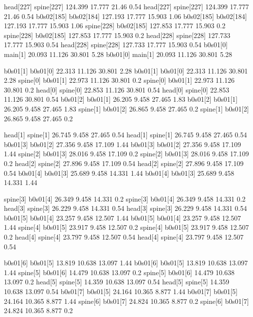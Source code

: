 head[227]    spine[227]    124.399    17.777    21.46    0.54
head[227]    spine[227]    124.399    17.777    21.46    0.54
b0s02[185]    b0s02[184]    127.193    17.777    15.903    1.06
b0s02[185]    b0s02[184]    127.193    17.777    15.903    1.06
spine[228]    b0s02[185]    127.853    17.777    15.903    0.2
spine[228]    b0s02[185]    127.853    17.777    15.903    0.2
head[228]    spine[228]    127.733    17.777    15.903    0.54
head[228]    spine[228]    127.733    17.777    15.903    0.54
b0s01[0]    main[1]    20.093    11.126    30.801    5.28
b0s01[0]    main[1]    20.093    11.126    30.801    5.28


b0s01[1]    b0s01[0]    22.313    11.126    30.801    2.28
b0s01[1]    b0s01[0]    22.313    11.126    30.801    2.28
spine[0]    b0s01[1]    22.973    11.126    30.801    0.2
spine[0]    b0s01[1]    22.973    11.126    30.801    0.2
head[0]    spine[0]    22.853    11.126    30.801    0.54
head[0]    spine[0]    22.853    11.126    30.801    0.54
b0s01[2]    b0s01[1]    26.205    9.458    27.465    1.83
b0s01[2]    b0s01[1]    26.205    9.458    27.465    1.83
spine[1]    b0s01[2]    26.865    9.458    27.465    0.2
spine[1]    b0s01[2]    26.865    9.458    27.465    0.2


head[1]    spine[1]    26.745    9.458    27.465    0.54
head[1]    spine[1]    26.745    9.458    27.465    0.54
b0s01[3]    b0s01[2]    27.356    9.458    17.109    1.44
b0s01[3]    b0s01[2]    27.356    9.458    17.109    1.44
spine[2]    b0s01[3]    28.016    9.458    17.109    0.2
spine[2]    b0s01[3]    28.016    9.458    17.109    0.2
head[2]    spine[2]    27.896    9.458    17.109    0.54
head[2]    spine[2]    27.896    9.458    17.109    0.54
b0s01[4]    b0s01[3]    25.689    9.458    14.331    1.44
b0s01[4]    b0s01[3]    25.689    9.458    14.331    1.44


spine[3]    b0s01[4]    26.349    9.458    14.331    0.2
spine[3]    b0s01[4]    26.349    9.458    14.331    0.2
head[3]    spine[3]    26.229    9.458    14.331    0.54
head[3]    spine[3]    26.229    9.458    14.331    0.54
b0s01[5]    b0s01[4]    23.257    9.458    12.507    1.44
b0s01[5]    b0s01[4]    23.257    9.458    12.507    1.44
spine[4]    b0s01[5]    23.917    9.458    12.507    0.2
spine[4]    b0s01[5]    23.917    9.458    12.507    0.2
head[4]    spine[4]    23.797    9.458    12.507    0.54
head[4]    spine[4]    23.797    9.458    12.507    0.54


b0s01[6]    b0s01[5]    13.819    10.638    13.097    1.44
b0s01[6]    b0s01[5]    13.819    10.638    13.097    1.44
spine[5]    b0s01[6]    14.479    10.638    13.097    0.2
spine[5]    b0s01[6]    14.479    10.638    13.097    0.2
head[5]    spine[5]    14.359    10.638    13.097    0.54
head[5]    spine[5]    14.359    10.638    13.097    0.54
b0s01[7]    b0s01[5]    24.164    10.365    8.877    1.44
b0s01[7]    b0s01[5]    24.164    10.365    8.877    1.44
spine[6]    b0s01[7]    24.824    10.365    8.877    0.2
spine[6]    b0s01[7]    24.824    10.365    8.877    0.2


